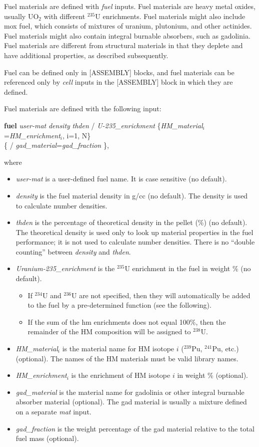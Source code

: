 Fuel materials are defined with {\it fuel} inputs.
Fuel materials are heavy metal oxides, usually UO$_2$ with different $^{235}$U enrichments.
Fuel materials might also include \ac{mox} fuel, which consists of mixtures of uranium, plutonium, and other actinides.
Fuel materials might also contain integral burnable absorbers, such as gadolinia.
Fuel materials are different from structural materials in that they deplete and have
additional properties, as described subsequently.

Fuel can be defined only in [ASSEMBLY] blocks, and fuel materials can be referenced only by {\it cell} inputs
in the [ASSEMBLY] block in which they are defined.

Fuel materials are defined with the following input:

{\bf fuel} {\it user-mat} {\it density} {\it thden} / {\it U-235\_enrichment}
    \{{\it HM\_material$_i$}={\it HM\_enrichment$_i$}, i=1, N\}  \\
   \{ / {\it gad\_material}={\it gad\_fraction} \},

where
\begin{itemize}   %
  \item {\it user-mat} is a user-defined fuel name. It is case sensitive (no default).
  \item {\it density} is the fuel material density in g/cc (no default).
     The density is used to calculate number densities.
  \item {\it thden} is the percentage of theoretical density in the pellet (\%) (no default).
   The theoretical density is used only to look up material properties in the fuel performance;
   it is not used to calculate number densities. There is no ``double counting'' between
   {\it density} and {\it thden}.
  \item {\it Uranium-235\_enrichment} is the $^{235}$U enrichment in the fuel in weight \% (no default).
  \begin{itemize}   %
    \item If $^{234}$U and $^{236}$U are not specified, then they will automatically be added to the
       fuel by a pre-determined function (see the following).
    \item If the sum of the \ac{hm} enrichments does not equal 100\%, then the remainder of the
        HM composition will be assigned to $^{238}$U.
  \end{itemize}
  \item {\it HM\_material$_i$} is the material name for HM isotope $i$ ($^{239}$Pu, $^{241}$Pu, etc.) (optional).
    The names of the HM materials must be valid library names.
  \item {\it HM\_enrichment$_i$} is the enrichment of HM isotope $i$ in weight \% (optional).
  \item {\it gad\_material} is the material name for gadolinia or other integral burnable absorber material (optional).
        The gad material is usually a mixture defined on a separate {\it mat} input.
  \item {\it gad\_fraction} is the weight percentage of the gad material relative to the total fuel mass (optional).
\end{itemize}

